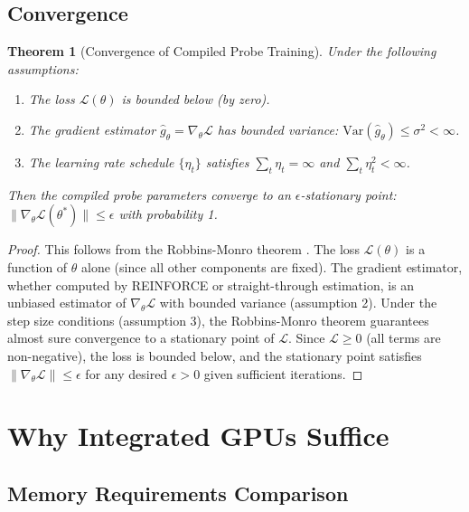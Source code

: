 \documentclass[11pt,twocolumn,a4paper]{article}
\newtheorem{theorem}{Theorem}[section]
\theoremstyle{definition}
\theoremstyle{remark}
\newcommand{\loss}{\mathcal{L}}
\newcommand{\params}{\theta}
\begin{document}
\subsection{Convergence}

\begin{theorem}[Convergence of Compiled Probe Training]
\label{thm:convergence}
Under the following assumptions:
\begin{enumerate}[nosep]
\item The loss $\loss(\params)$ is bounded below (by zero).
\item The gradient estimator $\hat{g}_\params = \nabla_\params \loss$ has bounded variance: $\mathrm{Var}(\hat{g}_\params) \leq \sigma^2 < \infty$.
\item The learning rate schedule $\{\eta_t\}$ satisfies $\sum_t \eta_t = \infty$ and $\sum_t \eta_t^2 < \infty$.
\end{enumerate}
Then the compiled probe parameters converge to an $\epsilon$-stationary point: $\|\nabla_\params \loss(\params^*)\| \leq \epsilon$ with probability 1.
\end{theorem}

\begin{proof}
This follows from the Robbins-Monro theorem \citep{robbins1951}. The loss $\loss(\params)$ is a function of $\params$ alone (since all other components are fixed). The gradient estimator, whether computed by REINFORCE or straight-through estimation, is an unbiased estimator of $\nabla_\params \loss$ with bounded variance (assumption 2). Under the step size conditions (assumption 3), the Robbins-Monro theorem guarantees almost sure convergence to a stationary point of $\loss$. Since $\loss \geq 0$ (all terms are non-negative), the loss is bounded below, and the stationary point satisfies $\|\nabla_\params \loss\| \leq \epsilon$ for any desired $\epsilon > 0$ given sufficient iterations.
\end{proof}


\section{Why Integrated GPUs Suffice}
\label{sec:integrated_gpu}

\subsection{Memory Requirements Comparison}
\end{document}
